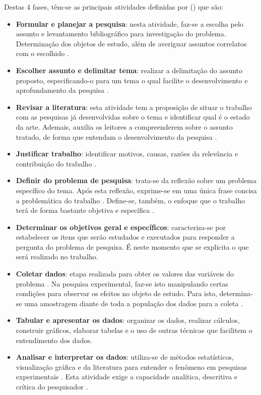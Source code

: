 Destas 4 fases, têm-se as principais atividades definidas por \citeauthor{PRODANOV2013} (\citeyear{PRODANOV2013}) que são:

\begin{itemize}
  \item \textbf{Formular e planejar a pesquisa}: nesta atividade, faz-se a escolha pelo assunto e levantamento bibliográfico para investigação do problema. Determinação dos objetos de estudo, além de averiguar assuntos correlatos com o escolhido \cite{PRODANOV2013}.
  \item \textbf{Escolher assunto e delimitar tema}: realizar a delimitação do assunto proposto, especificando-o para um tema o qual facilite o desenvolvimento e aprofundamento da pesquisa \cite{PRODANOV2013}.
  \item \textbf{Revisar a literatura}: esta atividade tem a proposição de situar o trabalho com as pesquisas já desenvolvidas sobre o tema e identificar qual é o estado da arte. Ademais, auxilia os leitores a compreenderem sobre o assunto tratado, de forma que entendam o desenvolvimento da pesquisa \cite{PRODANOV2013}.
  \item \textbf{Justificar trabalho}: identificar motivos, causas, razões da relevância e contribuição do trabalho \cite{PRODANOV2013}.
  \item \textbf{Definir do problema de pesquisa}: trata-se da reflexão sobre um problema específico do tema. Após esta reflexão, exprime-se em uma única frase concisa a problemática do trabalho \cite{PRODANOV2013}. Define-se, também, o enfoque que o trabalho terá de forma bastante objetiva e específica \cite{GIL2002}.
  \item \textbf{Determinar os objetivos geral e específicos}: caracteriza-se por estabelecer os itens que serão estudados e executados para responder a pergunta do problema de pesquisa. É neste momento que se explicita o que será realizado no trabalho.
  \item \textbf{Coletar dados}: etapa realizada para obter os valores das variáveis do problema \cite{PRODANOV2013}. Na pesquisa experimental, faz-se isto manipulando certas condições para observar os efeitos no objeto de estudo. Para isto, determina-se uma amostragem diante de toda a população dos dados para a coleta \cite{GIL2002}.
  \item \textbf{Tabular e apresentar os dados}: organizar os dados, realizar cálculos, construir gráficos, elaborar tabelas e o uso de outras técnicas que facilitem o entendimento dos dados.
  \item \textbf{Analisar e interpretar os dados}: utiliza-se de métodos estatísticos, visualização gráfica e da literatura para entender o fenômeno em pesquisas experimentais \cite{GIL2002}. Esta atividade exige a capacidade analítica, descritiva e crítica do pesquisador \cite{PRODANOV2013}.   

\end{itemize}
